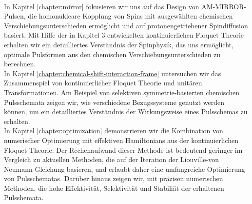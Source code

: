 \\
In Kapitel \ref{chapter:mirror} fokusieren wir uns auf das Design von AM-MIRROR-Pulsen, die homonukleare Kopplung von Spins mit ausgew\"{a}hlten chemischen Verschiebungsunterschieden erm\"{o}glicht und auf protonengetriebener Spindiffusion basiert. Mit Hilfe der in Kapitel 3 entwickelten kontinuierlichen Floquet Theorie erhalten wir ein detailliertes Verst\"{a}ndnis der Spinphysik, das uns erm\"{o}glicht, optimale Pulsformen aus den chemischen Verschiebungsunterschieden zu berechnen.
\\
In Kapitel \ref{chapter:chemical-shift-interaction-frame} untersuchen wir das Zusammenspiel von kontinuierlicher Floquet Theorie und unit\"{a}ren Transformationen. Am Beispiel von selektiven symmetrie-basierten chemischen Pulsschemata zeigen wir, wie verschiedene Bezugssysteme genutzt werden k\"{o}nnen, um ein detailliertes Verst\"{a}ndnis der Wirkungsweise eines Pulsschemas zu erhalten.
\\
In Kapitel \ref{chapter:optimization} demonstrieren wir die Kombination von numerischer Optimierung mit effektiven Hamiltonians aus der kontinuierlichen Floquet Theorie. Der Rechenaufwand dieser Methode ist bedeutend geringer im Vergleich zu aktuellen Methoden, die auf der Iteration der Liouville-von
Neumann-Gleichung basieren, und erlaubt daher eine umfangreiche Optimierung von Pulsschematas.
Dar\"{u}ber hinaus zeigen wir, mit pr\"{a}zisen numerischen Methoden, die hohe Effektivit\"{a}t, Selektivit\"{a}t und Stabili\"{a}t der erhaltenen Pulsshemata.







